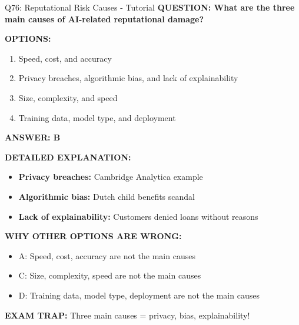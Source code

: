\documentclass[8pt]{beamer}
\begin{document}
	\begin{frame}{Q76: Reputational Risk Causes - Tutorial}
		\fontsize{6.5}{7.5}\selectfont
		\textbf{QUESTION: What are the three main causes of AI-related reputational damage?}
		
		\vspace{0.1cm}
		\textbf{OPTIONS:}
		\begin{enumerate}
			\item Speed, cost, and accuracy
			\item Privacy breaches, algorithmic bias, and lack of explainability
			\item Size, complexity, and speed
			\item Training data, model type, and deployment
		\end{enumerate}
		
		\vspace{0.1cm}
		\textcolor{myblue}{\textbf{ANSWER: B}}
		
		\vspace{0.1cm}
		\textbf{DETAILED EXPLANATION:}
		\begin{itemize}
			\item \textbf{Privacy breaches:} Cambridge Analytica example
			\item \textbf{Algorithmic bias:} Dutch child benefits scandal
			\item \textbf{Lack of explainability:} Customers denied loans without reasons
		\end{itemize}
		
		\vspace{0.1cm}
		\textcolor{myred}{\textbf{WHY OTHER OPTIONS ARE WRONG:}}
		\begin{itemize}
			\item \textcolor{myred}{A:} Speed, cost, accuracy are not the main causes
			\item \textcolor{myred}{C:} Size, complexity, speed are not the main causes
			\item \textcolor{myred}{D:} Training data, model type, deployment are not the main causes
		\end{itemize}
		
		\textcolor{myred}{\textbf{EXAM TRAP:}} Three main causes = \textcolor{myblue}{privacy, bias, explainability}!
	\end{frame}
	
\end{document}
